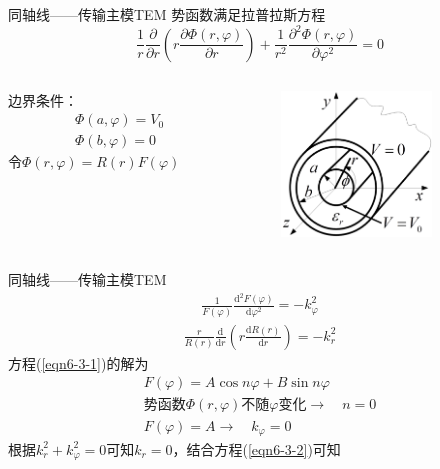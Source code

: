 \begin{frame}{同轴线——传输主模TEM}
    势函数满足拉普拉斯方程
    $$\frac{1}{r}\frac{\partial}{\partial r}\left(r\frac{\partial\Phi(r,\varphi)}{\partial r}\right)+\frac{1}{r^2}\frac{\partial^2\Phi(r,\varphi)}{\partial\varphi^2}=0$$
    \begin{columns}
        \begin{column}{0.5\linewidth}
            边界条件：\\
            \begin{align*}
                &\Phi(a,\varphi)=V_0\\
                &\Phi(b,\varphi)=0
            \end{align*}
            令$\Phi(r,\varphi)=R(r)F(\varphi)$
        \end{column}
        \begin{column}{0.5\linewidth}
            \begin{figure}
                \centering
                \includegraphics[width=4cm]{Cha6//fig6-30.png}
            \end{figure}
        \end{column}
    \end{columns}
\end{frame}

\begin{frame}{同轴线——传输主模TEM}
    \begin{align}
        \frac{1}{F(\varphi)}\frac{\mathrm{d}^2F(\varphi)}{\mathrm{d}\varphi^2}=-k_{\varphi}^2
        \label{eqn6-3-1}
    \end{align}
    \begin{align}
        \frac{r}{R(r)}\frac{\mathrm{d}}{\mathrm{d}r}\left(r\frac{\mathrm{d}R(r)}{\mathrm{d}r}\right)=-k_r^2
        \label{eqn6-3-2}
    \end{align}
    方程(\ref{eqn6-3-1})的解为
    \begin{gather*}
        F(\varphi)=A\cos n\varphi+B\sin n\varphi\\
        \text{势函数}\Phi(r,\varphi)\text{不随}\varphi\text{变化}\rightarrow\quad n=0\\
        F(\varphi)=A\rightarrow \quad k_{\varphi}=0
    \end{gather*}
    根据$k_r^2+k_{\varphi}^2=0$可知$k_r=0$，结合方程(\ref{eqn6-3-2})可知
\end{frame}

